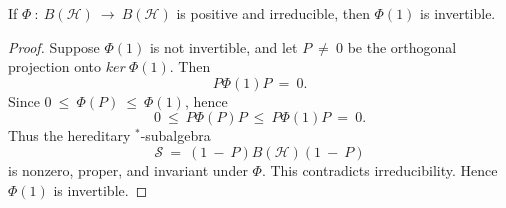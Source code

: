 \documentclass[11pt,a4paper]{article}
\begin{document}
    \begin{proposition}
    If $\Phi\ :\ B(\mathcal{H})\ \rightarrow\ B(\mathcal{H})$ is positive and irreducible, then $\Phi(1)$ is invertible.
    \end{proposition}
    \begin{proof} 
    Suppose $\Phi(1)$ is not invertible, and let $P\ \neq\ 0$ be the orthogonal projection onto $ker\ \Phi(1)$. Then $$P\Phi(1)P\ =\ 0.$$ Since $0\ \leq\ \Phi(P)\ \leq\ \Phi(1)$, hence $$0\ \leq\ P\Phi(P)P\ \leq\ P\Phi(1)P\ =\ 0.$$ Thus the hereditary $^*$-subalgebra $$\mathcal{S}\ =\ (1\ -\ P)B(\mathcal{H})(1\ -\ P)$$ is nonzero, proper, and invariant under $\Phi$. This contradicts irreducibility. Hence $\Phi(1)$ is invertible.
    \end{proof}
    \vspace{0.3cm} %
\end{document}
